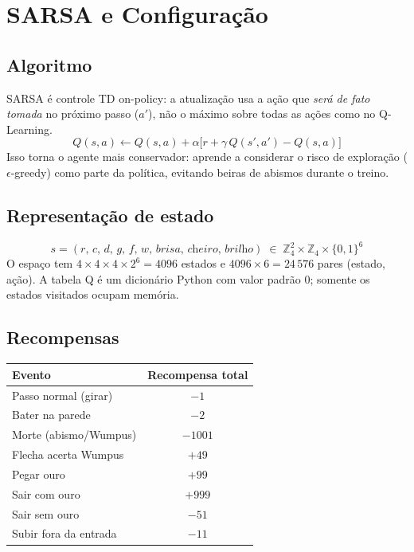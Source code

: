 \documentclass[11pt,a4paper]{article}
\begin{document}
\section{SARSA e Configura\c{c}\~ao}

\subsection{Algoritmo}

SARSA \'e controle TD on-policy: a atualiza\c{c}\~ao usa a a\c{c}\~ao que \textit{ser\'a de fato tomada} no
pr\'oximo passo ($a'$), n\~ao o m\'aximo sobre todas as a\c{c}\~oes como no Q-Learning.
\begin{equation}
Q(s, a) \leftarrow Q(s, a) + \alpha\bigl[r + \gamma\,Q(s', a') - Q(s, a)\bigr]
\end{equation}
Isso torna o agente mais conservador: aprende a considerar o risco de explora\c{c}\~ao
($\epsilon$-greedy) como parte da pol\'itica, evitando beiras de abismos durante o treino.

\subsection{Representa\c{c}\~ao de estado}
\begin{equation}
s = (r,\,c,\,d,\,g,\,f,\,w,\,\textit{brisa},\,\textit{cheiro},\,\textit{brilho})
\;\in\; \mathbb{Z}_4^2 \times \mathbb{Z}_4 \times \{0,1\}^6
\end{equation}
O espa\c{c}o tem $4\times4\times4\times2^6 = 4096$ estados e $4096\times6 = 24\,576$ pares (estado, a\c{c}\~ao).
A tabela Q \'e um dicion\'ario Python com valor padr\~ao 0; somente os estados visitados
ocupam mem\'oria.

\subsection{Recompensas}

\begin{table}[h]
\centering
\begin{tabular}{lc}
\toprule
Evento & Recompensa total \\
\midrule
Passo normal (girar) & $-1$ \\
Bater na parede      & $-2$ \\
Morte (abismo/Wumpus) & $-1001$ \\
Flecha acerta Wumpus & $+49$ \\
Pegar ouro           & $+99$ \\
Sair com ouro        & $+999$ \\
Sair sem ouro        & $-51$ \\
Subir fora da entrada & $-11$ \\
\bottomrule
\end{tabular}
\end{table}
\end{document}
